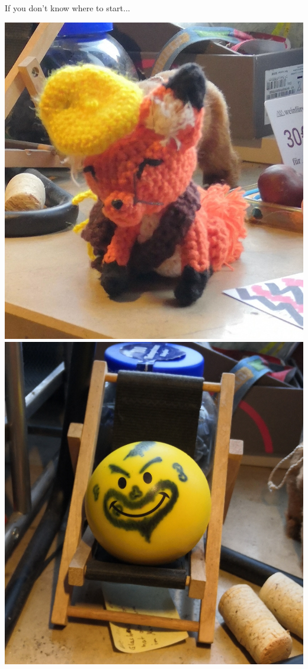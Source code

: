 \begin{frame}{If you don't know where to start...}
\begin{center}
\begin{minipage}{.5\linewidth}
		\begin{minipage}{\linewidth}
		\includegraphics[width=.45\linewidth]{./gfx/Selena}
		\hspace{1em}
		\includegraphics[width=.45\linewidth]{./gfx/Guenther}
		\end{minipage}
	\end{minipage}
\end{center}
%
\end{frame}


